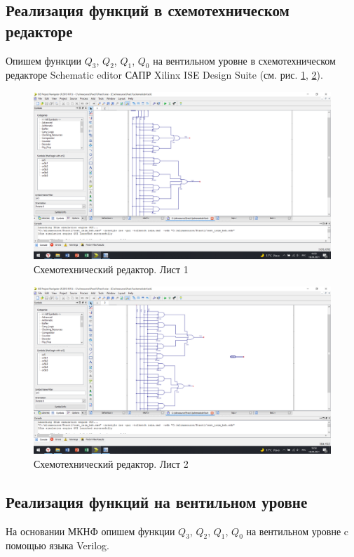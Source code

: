 \documentclass[a4paper,14pt]{extarticle}
\begin{document}
\subsection{Реализация функций в схемотехническом редакторе}
Опишем функции $Q_3$,  $Q_2$, $Q_1$,  $Q_0$ на вентильном уровне в схемотехническом редакторе Schematic editor САПР Xilinx ISE Design Suite (см. рис. \ref{fig:sheme1}, \ref{fig:sheme2}).

\begin{figure}[p]
	\centering
	\includegraphics[width=\linewidth]{images/sheme1}
	\caption{Схемотехнический редактор. Лист 1}
	\label{fig:sheme1}
\end{figure}

\begin{figure}[p]
	\centering
	\includegraphics[width=\linewidth]{images/sheme2}
	\caption{Схемотехнический редактор. Лист 2}
	\label{fig:sheme2}
\end{figure}

\subsection{Реализация функций на вентильном уровне}
На основании МКНФ опишем функции $Q_3$,  $Q_2$, $Q_1$,  $Q_0$ на вентильном уровне c помощью языка Verilog.
\end{document}
